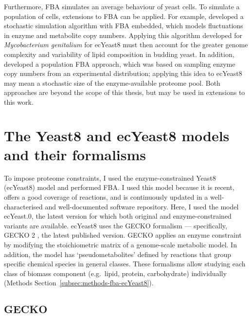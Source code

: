 Furthermore, FBA simulates an average behaviour of yeast cells.
To simulate a population of cells, extensions to FBA can be applied.
For example, \textcite{tourignySimulatingSinglecellMetabolism2021} developed a stochastic simulation algorithm with FBA embedded, which models fluctuations in enzyme and metabolite copy numbers.
Applying this algorithm developed for \textit{Mycobacterium genitalium} for ecYeast8 must then account for the greater genome complexity and variability of lipid composition \parencite{sanchezSLIMErProbingFlexibility2019} in budding yeast.
In addition, \textcite{labhsetwarPopulationFBAPredicts2017} developed a population FBA approach, which was based on sampling enzyme copy numbers from an experimental distribution; applying this idea to ecYeast8 may mean a stochastic size of the enzyme-available proteome pool.
Both approaches are beyond the scope of this thesis, but may be used in extensions to this work.


\section{The Yeast8 and ecYeast8 models and their formalisms}
\label{sec:model-yeast8}

To impose proteome constraints, I used the enzyme-constrained Yeast8 (ecYeast8) model \parencite{luConsensusCerevisiaeMetabolic2019} and performed FBA\@.
I used this model because it is recent, offers a good coverage of reactions, and is continuously updated in a well-characterised and well-documented software repository.
Here, I used the model ec\-Yeast.0, the latest version for which both original and enzyme-constrained variants are available.
ecYeast8 uses the GECKO formalism \parencite{sanchezImprovingPhenotypePredictions2017} --- specifically, GECKO 2 \parencite{domenzainReconstructionCatalogueGenomescale2022}, the latest published version.
GECKO applies an enzyme constraint by modifying the stoichiometric matrix of a genome-scale metabolic model.
In addition, the model has `pseudometabolites' defined by reactions that group specific chemical species in general classes.
These formalisms allow studying each class of biomass component (e.g.\ lipid, protein, carbohydrate) individually (Methods Section~\ref{subsec:methods-fba-ecYeast8}).


\subsection{GECKO}
\label{subsec:model-yeast8-gecko}

